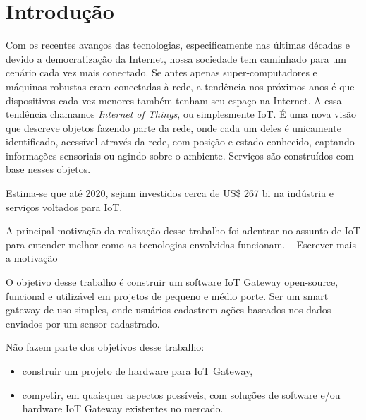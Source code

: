 \section*{Introdução}
\label{sec:intro}

Com os recentes avanços das tecnologias, especificamente nas últimas décadas e devido a democratização da Internet, nossa sociedade tem caminhado para um cenário cada vez mais conectado. Se antes apenas super-computadores e máquinas robustas eram conectadas à rede, a tendência nos próximos anos é que dispositivos cada vez menores também tenham seu espaço na Internet.
A essa tendência chamamos \textit{Internet of Things}, ou simplesmente IoT. É uma nova visão que descreve objetos fazendo parte da rede, onde cada um deles é unicamente identificado, acessível através da rede, com posição e estado conhecido, captando informações sensoriais ou agindo sobre o ambiente. Serviços são construídos com base nesses objetos.

Estima-se que até 2020, sejam investidos cerca de US\$ 267 bi na indústria e serviços voltados para IoT. \cite{BCGPerspectives} \cite{Forbes}

A principal motivação da realização desse trabalho foi adentrar no assunto de IoT para entender melhor como as tecnologias envolvidas funcionam.
-- Escrever mais a motivação

O objetivo desse trabalho é construir um software IoT Gateway open-source, funcional e utilizável em projetos de pequeno e médio porte. Ser um smart gateway de uso simples, onde usuários cadastrem ações baseados nos dados enviados por um sensor cadastrado.

Não fazem parte dos objetivos desse trabalho:
\begin{itemize}
	\item construir um projeto de hardware para IoT Gateway,
	\item competir, em quaisquer aspectos possíveis, com soluções de software e/ou hardware IoT Gateway existentes no mercado.
\end{itemize} 


